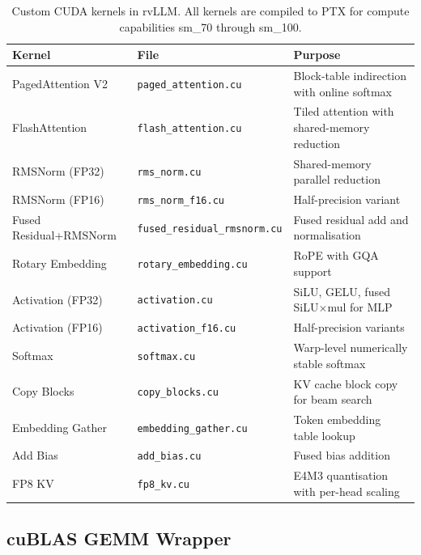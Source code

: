 \documentclass[11pt,a4paper]{article}
\newcommand{\thead}[1]{\textbf{\color{white}#1}}
\begin{document}
\begin{table}[t]
  \centering
  \caption{Custom CUDA kernels in rvLLM. All kernels are compiled to PTX for compute capabilities sm\_70 through sm\_100.}
  \label{tab:kernels}
  \small
  \begin{tabular}{@{}llp{5.5cm}@{}}
    \toprule
    \rowcolor{HeaderBlue} \thead{Kernel} & \thead{File} & \thead{Purpose} \\
    \midrule
    PagedAttention V2 & \texttt{paged\_attention.cu} & Block-table indirection with online softmax \\
    \rowcolor{gray!8}
    FlashAttention    & \texttt{flash\_attention.cu} & Tiled attention with shared-memory reduction \\
    RMSNorm (FP32)    & \texttt{rms\_norm.cu}        & Shared-memory parallel reduction \\
    \rowcolor{gray!8}
    RMSNorm (FP16)    & \texttt{rms\_norm\_f16.cu}    & Half-precision variant \\
    Fused Residual+RMSNorm & \texttt{fused\_residual\_rmsnorm.cu} & Fused residual add and normalisation \\
    \rowcolor{gray!8}
    Rotary Embedding  & \texttt{rotary\_embedding.cu} & RoPE with GQA support \\
    Activation (FP32) & \texttt{activation.cu}       & SiLU, GELU, fused SiLU$\times$mul for MLP \\
    \rowcolor{gray!8}
    Activation (FP16) & \texttt{activation\_f16.cu}   & Half-precision variants \\
    Softmax           & \texttt{softmax.cu}          & Warp-level numerically stable softmax \\
    \rowcolor{gray!8}
    Copy Blocks       & \texttt{copy\_blocks.cu}      & KV cache block copy for beam search \\
    Embedding Gather  & \texttt{embedding\_gather.cu}  & Token embedding table lookup \\
    \rowcolor{gray!8}
    Add Bias          & \texttt{add\_bias.cu}         & Fused bias addition \\
    FP8 KV            & \texttt{fp8\_kv.cu}           & E4M3 quantisation with per-head scaling \\
    \bottomrule
  \end{tabular}
\end{table}

\subsection{cuBLAS GEMM Wrapper}
\end{document}
